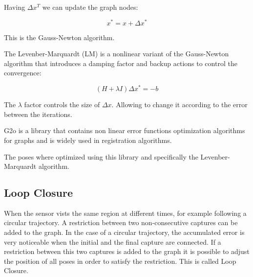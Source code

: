 Having $\Delta x^T$ we can update the graph nodes:

\begin{equation}
x^* = x + \Delta x^* 
\end{equation}

This is the Gauss-Newton algorithm. 

The Levenber-Marquardt (LM) is a nonlinear variant of the Gauss-Newton algorithm that introduces a
damping factor and backup actions to control the convergence:

\begin{equation}
(H + \lambda I) \Delta x^* = -b
\end{equation}

The $\lambda$ factor controls the size of $ \Delta x$. Allowing to change it according to the error between the iterations.
 


G2o is a library that contains non linear error functions optimization 
algorithms for graphs and is widely used in registration algorithms. 

The poses where optimized using this library and specifically the 
Levenber-Marquardt algorithm.



\subsection{Loop Closure}

When the sensor vists the same region at different times, for example following 
a circular trajectory. A restriction between two non-consecutive captures can be 
added to the graph. In the case of a circular trajectory, the accumulated error 
is very noticeable when the initial and the final capture are connected. If a 
restriction between this two captures is added to the graph it is possible to 
adjust the position of all poses in order to satisfy the restriction. This 
is called Loop Closure.


